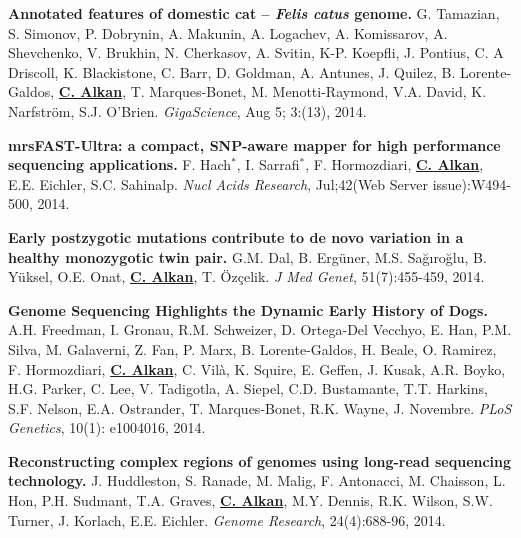                                        
  \vspace{-.2cm}        
  {\bf Annotated features of domestic cat – \textit{Felis catus} genome.}
  G. Tamazian, S. Simonov, P. Dobrynin, A. Makunin, A. Logachev, 
  A. Komissarov, A. Shevchenko, V. Brukhin, N. Cherkasov, A. Svitin,
  K-P. Koepfli, J. Pontius, C. A Driscoll, K. Blackistone, C. Barr, 
  D. Goldman, A. Antunes, J. Quilez, B. Lorente-Galdos,  {\bf {\underline {C. Alkan}}},
  T. Marques-Bonet, M. Menotti-Raymond, V.A. David, K. Narfström, S.J. O’Brien.
  {\em GigaScience}, Aug 5; 3:(13), 2014.
                                       
  \vspace{-.2cm}        
  {\bf mrsFAST-Ultra: a compact, SNP-aware mapper for high performance sequencing applications.}
    F. Hach$^*$,
    I. Sarrafi$^*$,
    F. Hormozdiari,
    {\bf {\underline {C. Alkan}}},
    E.E. Eichler,   S.C. Sahinalp.
    {\em Nucl Acids Research}, Jul;42(Web Server issue):W494-500, 2014.

  \vspace{-.2cm}        
         {\bf Early postzygotic mutations contribute to de novo variation in a healthy monozygotic twin pair.}
         G.M. Dal, B. Ergüner, M.S. Sağıroğlu, B. Yüksel, O.E. Onat, {\bf {\underline {C. Alkan}}}, T. Özçelik. 
         {\em J Med Genet}, 51(7):455-459, 2014.

  \vspace{-.2cm}        
         {\bf Genome Sequencing Highlights the Dynamic Early History of Dogs.} 
         A.H. Freedman, I. Gronau, R.M. Schweizer, D. Ortega-Del Vecchyo, E. Han, P.M. Silva, 
         M. Galaverni, Z. Fan, P. Marx, B. Lorente-Galdos, H. Beale, O. Ramirez, F. Hormozdiari, 
         {\bf {\underline {C. Alkan}}}, 
         C. Vilà, K. Squire, E. Geffen, J. Kusak, A.R. Boyko, H.G. Parker, 
         C. Lee, V. Tadigotla, A. Siepel, C.D. Bustamante, T.T. Harkins, S.F. Nelson, 
         E.A. Ostrander, T. Marques-Bonet, R.K. Wayne, J. Novembre. 
         {\em PLoS Genetics}, 10(1): e1004016, 2014.


 \vspace{-.2cm}        
        {\bf Reconstructing complex regions of genomes using long-read sequencing technology.}
         J. Huddleston, S. Ranade, M. Malig, F. Antonacci, M. Chaisson, L. Hon, P.H. Sudmant, T.A. Graves, 
         {\bf {\underline{C. Alkan}}}, M.Y. Dennis, R.K. Wilson, S.W. Turner, J. Korlach, E.E. Eichler. 
         {\em Genome Research},  24(4):688-96, 2014.

